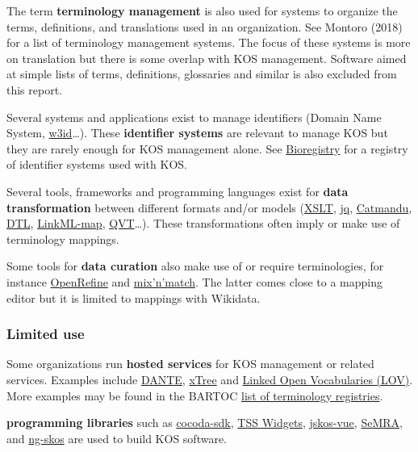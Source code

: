\documentclass[
  DIV=10]{article}
\begin{document}
The term \textbf{terminology management} is also used for systems to
organize the terms, definitions, and translations used in an
organization. See Montoro (2018) for a list of terminology management
systems. The focus of these systems is more on translation but there is
some overlap with KOS management. Software aimed at simple lists of
terms, definitions, glossaries and similar is also excluded from this
report.

Several systems and applications exist to manage identifiers (Domain
Name System, \href{https://w3id.org/}{w3id}\ldots). These
\textbf{identifier systems} are relevant to manage KOS but they are
rarely enough for KOS management alone. See
\href{https://bioregistry.io/}{Bioregistry} for a registry of identifier
systems used with KOS.

Several tools, frameworks and programming languages exist for
\textbf{data transformation} between different formats and/or models
(\href{https://en.wikipedia.org/wiki/XSLT}{XSLT},
\href{https://jqlang.org/}{jq}, \href{https://librecat.org/}{Catmandu},
\href{https://getdtl.org/}{DTL},
\href{https://linkml.io/linkml-map/}{LinkML-map},
\href{https://en.wikipedia.org/wiki/QVT}{QVT}\ldots). These
transformations often imply or make use of terminology mappings.

Some tools for \textbf{data curation} also make use of or require
terminologies, for instance \href{https://openrefine.org/}{OpenRefine}
and \href{https://mix-n-match.toolforge.org/}{mix'n'match}. The latter
comes close to a mapping editor but it is limited to mappings with
Wikidata.

\subsubsection{Limited use}\label{limited-use}

Some organizations run \textbf{hosted services} for KOS management or
related services. Examples include
\href{https://doi.org/10.11588/akmb.2018.1.63475}{DANTE},
\href{https://xtree-public.digicult-verbund.de/}{xTree} and
\href{http://lov.okfn.org/dataset/lov/}{Linked Open Vocabularies (LOV)}.
More examples may be found in the BARTOC
\href{https://bartoc.org/registries}{list of terminology registries}.

\textbf{programming libraries} such as
\href{https://github.com/gbv/cocoda-sdk/}{cocoda-sdk},
\href{https://github.com/ts4nfdi/terminology-service-suite}{TSS
Widgets}, \href{https://github.com/gbv/jskos-vue/}{jskos-vue},
\href{https://semra.readthedocs.io/}{SeMRA}, and
\href{http://gbv.github.io/ng-skos/}{ng-skos} are used to build KOS
software.
\end{document}
